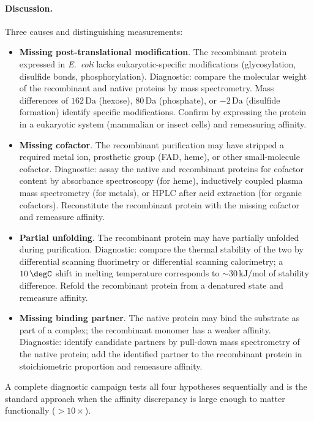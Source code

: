 \paragraph{Discussion.}
Three causes and distinguishing measurements:
\begin{itemize}[leftmargin=*]
\item \textbf{Missing post-translational modification}. The
  recombinant protein expressed in \emph{E.~coli} lacks
  eukaryotic-specific modifications (glycosylation, disulfide bonds,
  phosphorylation). Diagnostic: compare the molecular weight of the
  recombinant and native proteins by mass spectrometry. Mass
  differences of $162\,\text{Da}$ (hexose), $80\,\text{Da}$ (phosphate),
  or $-2\,\text{Da}$ (disulfide formation) identify specific
  modifications. Confirm by expressing the protein in a eukaryotic
  system (mammalian or insect cells) and remeasuring affinity.
\item \textbf{Missing cofactor}. The recombinant purification may
  have stripped a required metal ion, prosthetic group (FAD, heme),
  or other small-molecule cofactor. Diagnostic: assay the native
  and recombinant proteins for cofactor content by absorbance
  spectroscopy (for heme), inductively coupled plasma mass
  spectrometry (for metals), or HPLC after acid extraction (for
  organic cofactors). Reconstitute the recombinant protein with the
  missing cofactor and remeasure affinity.
\item \textbf{Partial unfolding}. The recombinant protein may have
  partially unfolded during purification. Diagnostic: compare the
  thermal stability of the two by differential scanning fluorimetry
  or differential scanning calorimetry; a $10\,\degC$ shift in
  melting temperature corresponds to $\sim 30\,\text{kJ}/\text{mol}$
  of stability difference. Refold the recombinant protein from a
  denatured state and remeasure affinity.
\item \textbf{Missing binding partner}. The native protein may bind
  the substrate as part of a complex; the recombinant monomer has a
  weaker affinity. Diagnostic: identify candidate partners by
  pull-down mass spectrometry of the native protein; add the
  identified partner to the recombinant protein in stoichiometric
  proportion and remeasure affinity.
\end{itemize}
A complete diagnostic campaign tests all four hypotheses sequentially
and is the standard approach when the affinity discrepancy is large
enough to matter functionally ($> 10\times$).

